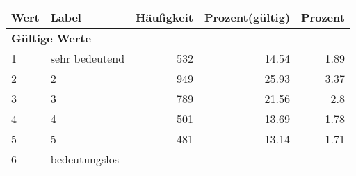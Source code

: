      \begin{longtable}{lXrrr}
     \toprule
     \textbf{Wert} & \textbf{Label} & \textbf{Häufigkeit} & \textbf{Prozent(gültig)} & \textbf{Prozent} \\
     \endhead
     \midrule
     \multicolumn{5}{l}{\textbf{Gültige Werte}}\\

     1 &
     \multicolumn{1}{X}{ sehr bedeutend   } &


       \num{532} &
       \num[round-mode=places,round-precision=2]{14,54} &
         \num[round-mode=places,round-precision=2]{1,89} \\

     2 &
     \multicolumn{1}{X}{ 2   } &


       \num{949} &
       \num[round-mode=places,round-precision=2]{25,93} &
         \num[round-mode=places,round-precision=2]{3,37} \\

     3 &
     \multicolumn{1}{X}{ 3   } &


       \num{789} &
       \num[round-mode=places,round-precision=2]{21,56} &
         \num[round-mode=places,round-precision=2]{2,8} \\

     4 &
     \multicolumn{1}{X}{ 4   } &


       \num{501} &
       \num[round-mode=places,round-precision=2]{13,69} &
         \num[round-mode=places,round-precision=2]{1,78} \\

     5 &
     \multicolumn{1}{X}{ 5   } &


       \num{481} &
       \num[round-mode=places,round-precision=2]{13,14} &
         \num[round-mode=places,round-precision=2]{1,71} \\

     6 &
     \multicolumn{1}{X}{ bedeutungslos   } &



\end{longtable}
